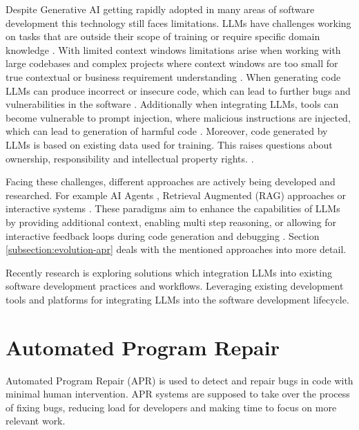 Despite Generative AI getting rapidly adopted in many areas of software development this technology still faces limitations. LLMs have challenges working on tasks that are outside their scope of training or require specific domain knowledge \cite{houLargeLanguageModels2024}. With limited context windows limitations arise when working with large codebases and complex projects where context windows are too small for true contextual or business requirement understanding \cite{bhargavmallampatiRoleGenerativeAI2025}. When generating code LLMs can produce incorrect or insecure code, which can lead to further bugs and vulnerabilities in the software \cite{houLargeLanguageModels2024, bhargavmallampatiRoleGenerativeAI2025}. Additionally when integrating LLMs, tools can become vulnerable to prompt injection, where malicious instructions are injected, which can lead to generation of harmful code \cite{liuPromptInjectionAttack2024}. Moreover, code generated by LLMs is based on existing data used for training. This raises questions about ownership, responsibility and intellectual property rights. \cite{sauvolaFutureSoftwareDevelopment2024, houLargeLanguageModels2024}.

Facing these challenges, different approaches are actively being developed and researched. For example AI Agents \cite{liuMarsCodeAgentAInative2024,yangSWEagentAgentComputerInterfaces2024}, Retrieval Augmented (RAG) approaches \cite{xiaAgentlessDemystifyingLLMbased2024} or interactive systems \cite{xiaAutomatedProgramRepair2024}. These paradigms aim to enhance the capabilities of LLMs by providing additional context, enabling multi step reasoning, or allowing for interactive feedback loops during code generation and debugging \cite{houLargeLanguageModels2024, puvvadiCodingAgentsComprehensive2025}. Section \ref{subsection:evolution-apr} deals with the mentioned approaches into more detail.

Recently research is exploring solutions which integration LLMs into existing software development practices and workflows. Leveraging existing development tools and platforms for integrating LLMs into the software development lifecycle. \cite{puvvadiCodingAgentsComprehensive2025, dohmkeGitHubCopilotMeet2025, IntroducingCodex, sauvolaFutureSoftwareDevelopment2024}

\section{Automated Program Repair}

Automated Program Repair (APR) is used to detect and repair bugs in code with minimal human intervention. \cite{zhangSurveyLearningbasedAutomated2024} APR systems are supposed to take over the process of fixing bugs, reducing load for developers and making time to focus on more relevant work. \cite{houLargeLanguageModels2024}

